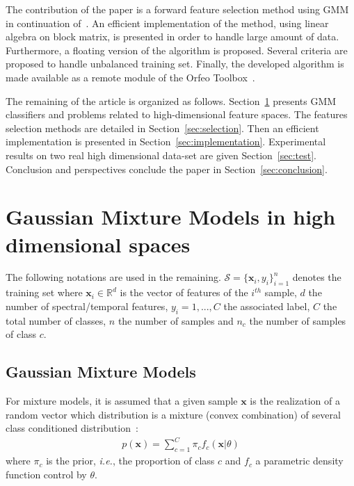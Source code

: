 \documentclass[journal,peerreview,onecolumn]{IEEEtran}
\begin{document}
The contribution of the paper is a forward feature selection method using GMM in continuation of~\cite{fauvel2015fast}. An efficient implementation of the method, using linear algebra on block matrix, is presented in order to handle large amount of data. Furthermore, a floating version of the algorithm is proposed. Several criteria are proposed to handle unbalanced training set.  Finally, the developed algorithm is made available as a remote module of the Orfeo Toolbox~\cite{christophe2008orfeo}.


The     remaining    of     the     article     is    organized     as
follows.   Section~\ref{sec:gmm-hd}  presents   GMM  classifiers   and
problems  related to  high-dimensional  feature  spaces. The  features
selection methods are detailed in Section~\ref{sec:selection}. Then an
efficient         implementation        is         presented        in
Section~\ref{sec:implementation}.  Experimental  results on  two  real
high dimensional data-set are given Section~\ref{sec:test}. Conclusion
and perspectives conclude the paper in Section~\ref{sec:conclusion}.

\section{Gaussian Mixture Models in high dimensional spaces}
\label{sec:gmm-hd}

The    following    notations    are   used    in    the    remaining.
$\mathcal{S}  = \{\mathbf{x}_i,y_i\}_{i=1}^{n}$  denotes the  training
set where $\mathbf{x}_i \in \mathbb{R}^d$ is the vector of features of
the  $i^{th}$ sample,  $d$  the number  of spectral/temporal  features,
$y_i = 1,...,C$ the associated label, $C$ the total number of classes,
$n$ the  number of samples  and $n_c$ the  number of samples  of class
$c$.

    \subsection{Gaussian Mixture Models}

    For mixture models, it is assumed  that a given sample $\mathbf{x}$ is
    the realization  of a  random vector which  distribution is  a mixture
    (convex     combination)     of      several     class     conditioned
    distribution~\cite{Fraley00model-basedclustering}:
    \begin{align}
        p(\mathbf{x}) = \sum_{c=1}^{C} \pi_c f_c(\mathbf{x}|\theta)
    \end{align}
    where $\pi_c$ is  the prior, \emph{i.e.}, the  proportion of class
    $c$  and  $f_c$  a  parametric density  function  control by
    $\theta$.
\end{document}
